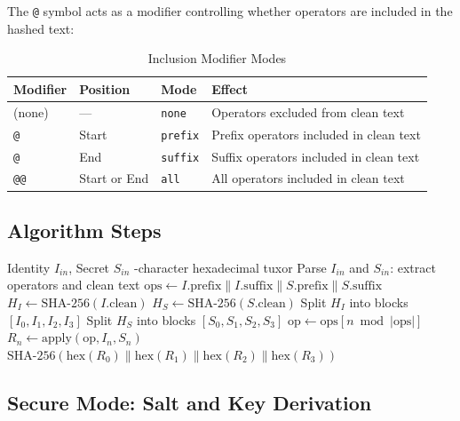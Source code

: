 \documentclass[11pt,a4paper]{article}
\begin{document}
The \texttt{@} symbol acts as a modifier controlling whether operators are included in the hashed text:

\begin{table}[h]
\centering
\caption{Inclusion Modifier Modes}
\label{tab:modifier}
\begin{tabular}{@{}llll@{}}
\toprule
Modifier & Position & Mode & Effect \\
\midrule
(none) & --- & \texttt{none} & Operators excluded from clean text \\
\texttt{@} & Start & \texttt{prefix} & Prefix operators included in clean text \\
\texttt{@} & End & \texttt{suffix} & Suffix operators included in clean text \\
\texttt{@@} & Start or End & \texttt{all} & All operators included in clean text \\
\bottomrule
\end{tabular}
\end{table}

\subsection{Algorithm Steps}

\begin{algorithm}
\caption{TUXOR Computation}
\label{alg:tuxor}
\begin{algorithmic}[1]
\Require Identity $I_{in}$, Secret $S_{in}$
-character hexadecimal tuxor
\State Parse $I_{in}$ and $S_{in}$: extract operators and clean text
\State $\text{ops} \gets I.\text{prefix} \| I.\text{suffix} \| S.\text{prefix} \| S.\text{suffix}$
\State $H_I \gets \text{SHA-256}(I.\text{clean})$ 
\State $H_S \gets \text{SHA-256}(S.\text{clean})$ 
\State Split $H_I$ into blocks $[I_0, I_1, I_2, I_3]$ 
\State Split $H_S$ into blocks $[S_0, S_1, S_2, S_3]$
  \State $\text{op} \gets \text{ops}[n \bmod |\text{ops}|]$
  \State $R_n \gets \text{apply}(\text{op}, I_n, S_n)$ 
\EndFor
\State \Return $\text{SHA-256}(\text{hex}(R_0) \| \text{hex}(R_1) \| \text{hex}(R_2) \| \text{hex}(R_3))$
\end{algorithmic}
\end{algorithm}

\subsection{Secure Mode: Salt and Key Derivation}
\end{document}

